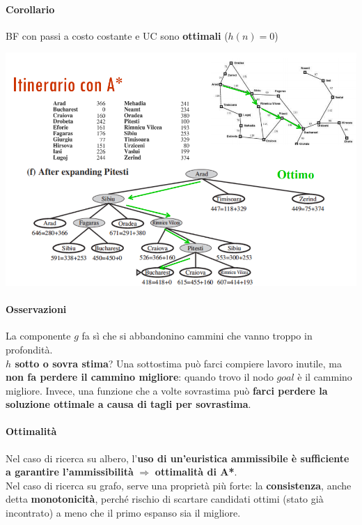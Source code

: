 \documentclass[10pt]{book}
\begin{document}
\paragraph{Corollario} BF con passi a costo costante e UC sono \textbf{ottimali} ($h(n) = 0$)
\begin{center}
	\includegraphics[scale=0.5]{itAstar.png}
\end{center}
\pagebreak
\paragraph{Osservazioni} La componente $g$ fa sì che si abbandonino cammini che vanno troppo in profondità.\\
\textbf{$h$ sotto o sovra stima}? Una sottostima può farci compiere lavoro inutile, ma \textbf{non fa perdere il cammino migliore}: quando trovo il nodo $goal$ è il cammino migliore. Invece, una funzione che a volte sovrastima può \textbf{farci perdere la soluzione ottimale a causa di tagli per sovrastima}.
\paragraph{Ottimalità} Nel caso di ricerca su albero, l'\textbf{uso di un'euristica ammissibile è sufficiente a garantire l'ammissibilità} $\Rightarrow$ \textbf{ottimalità di A*}.\\
Nel caso di ricerca su grafo, serve una proprietà più forte: la \textbf{consistenza}, anche detta \textbf{monotonicità}, perché rischio di scartare candidati ottimi (stato già incontrato) a meno che il primo espanso sia il migliore.
\end{document}
